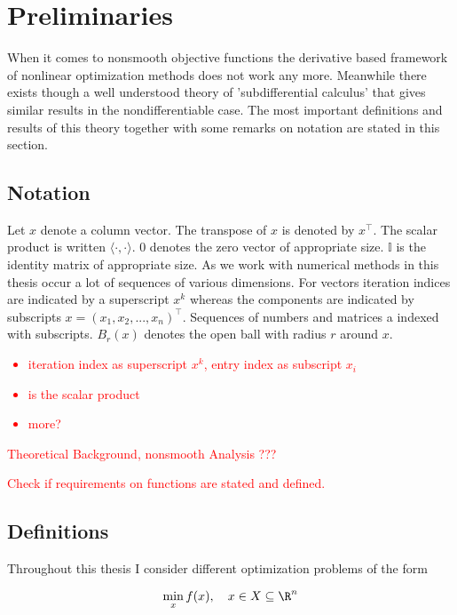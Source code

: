 \section{Preliminaries}

When it comes to nonsmooth objective functions the  derivative based framework of nonlinear optimization methods does not work any more. Meanwhile there exists though a well understood theory of 'subdifferential calculus' that gives similar results in the nondifferentiable case.
The most important definitions and results of this theory together with some remarks on notation are stated in this section.


\subsection{Notation}

Let \(x\) denote a column vector. The transpose of \(x\) is denoted by \(x^{\top}\). The scalar product is written \(\langle \cdot, \cdot \rangle\).
\(0\) denotes the zero vector of appropriate size. \(\mathbb{I}\) is the identity matrix of appropriate size.
As we work with numerical methods in this thesis occur a lot of sequences of various dimensions. For vectors iteration indices are indicated by a superscript \(x^k\) whereas the components are  indicated by subscripts \(x = (x_1,x_2,...,x_n)^{\top}\). Sequences of numbers and matrices a indexed with subscripts.
\(B_{r}(x)\) denotes the open ball with radius \(r\) around \(x\).


\textcolor{red}{
\begin{itemize}
	\item iteration index as superscript \(x^k\), entry index as subscript \(x_i\)
	\item  is the scalar product
	\item more?
\end{itemize}}


\textcolor{red}{Theoretical Background, nonsmooth Analysis ???}

\textcolor{red}{Check if requirements on functions are stated and defined.}\\

\subsection{Definitions}

Throughout this thesis I consider different optimization problems of the form

\begin{equation*}
\min_{x} f(x), \quad x \in X \subseteq \R^n
\label{min_prob}
\end{equation*}

